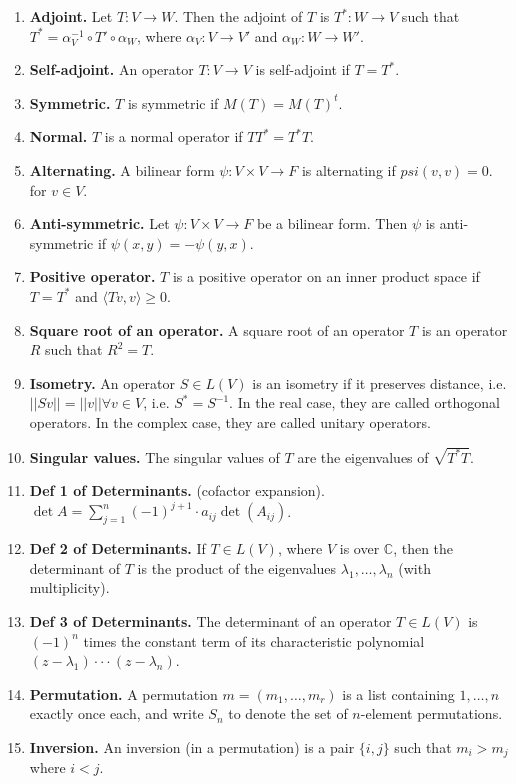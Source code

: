 \begin{enumerate}
	\item \textbf{Adjoint. } Let $T: V \to W$. Then the adjoint of $T$ is $T^*: W \to V$ such that $T^* = \alpha_V^{-1} \circ T' \circ \alpha_W$, where $\alpha_V: V \to V'$ and $\alpha_W: W \to W'$. 
	\item \textbf{Self-adjoint. } An operator $T: V \to V$ is self-adjoint if $T = T^*$. 
	\item \textbf{Symmetric. } $T$ is symmetric if $M(T) = M(T)^t$. 
	\item \textbf{Normal. } $T$ is a normal operator if $TT^* = T^*T$. 
	\item \textbf{Alternating. } A bilinear form $\psi: V \times V \to F$ is alternating if $psi(v,v) = 0$. for $v \in V$. 
	\item \textbf{Anti-symmetric. } Let $\psi: V \times V \to F$ be a bilinear form. Then $\psi$ is anti-symmetric if $\psi(x,y) = -\psi(y,x)$. 
	\item \textbf{Positive operator. } $T$ is a positive operator on an inner product space if $T=T^*$ and $\langle Tv,v \rangle \geq 0$. 
	\item \textbf{Square root of an operator. } A square root of an operator $T$ is an operator $R$ such that $R^2 = T$. 
	\item \textbf{Isometry. } An operator $S \in L(V)$ is an isometry if it preserves distance, i.e. $||Sv|| = ||v|| \forall v \in V$, i.e. $S^* = S^{-1}$. In the real case, they are called orthogonal operators. In the complex case, they are called unitary operators. 
	\item \textbf{Singular values. } The singular values of $T$ are the eigenvalues of $\sqrt{T^*T}$. 
	\item \textbf{Def 1 of Determinants. } (cofactor expansion). $\det A = \sum_{j=1}^n (-1)^{j+1} \cdot a_{ij} \det (A_{ij})$. 
	\item \textbf{Def 2 of Determinants. } If $T \in L(V)$, where $V$ is over $\mathbb{C}$, then the determinant of $T$ is the product of the eigenvalues $\lambda_1,\dots,\lambda_n$ (with multiplicity). 
	\item \textbf{Def 3 of Determinants. } The determinant of an operator $T \in L(V)$ is $(-1)^n$ times the constant term of its characteristic polynomial $(z-\lambda_1) \cdot \cdot \cdot (z-\lambda_n)$. 
	\item \textbf{Permutation. } A permutation $m=(m_1,\dots,m_r)$ is a list containing $1,\dots,n$ exactly once each, and write $S_n$ to denote the set of $n$-element permutations. 
	\item \textbf{Inversion. } An inversion (in a permutation) is a pair $\{i,j\}$ such that $m_i > m_j$ where $i < j$. 

\end{enumerate}
